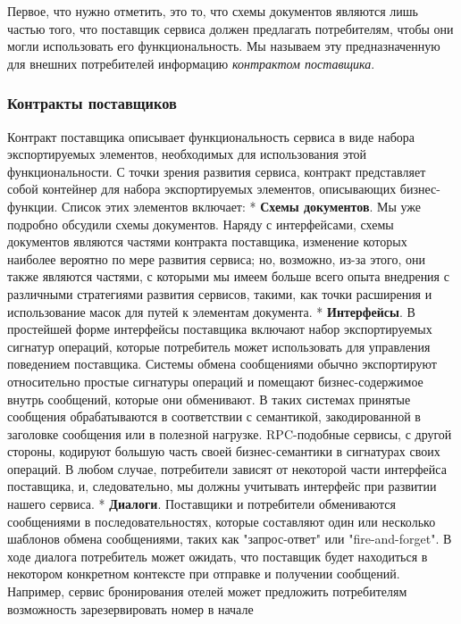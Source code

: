 \documentclass[11pt]{article}
\begin{document}
Первое, что нужно отметить, это то, что схемы документов являются лишь
частью того, что поставщик сервиса должен предлагать потребителям, чтобы
они могли использовать его функциональность. Мы называем эту
предназначенную для внешних потребителей информацию \emph{контрактом
поставщика}.

\subsubsection{Контракты
поставщиков}\label{ux43aux43eux43dux442ux440ux430ux43aux442ux44b-ux43fux43eux441ux442ux430ux432ux449ux438ux43aux43eux432}

Контракт поставщика описывает функциональность сервиса в виде набора
экспортируемых элементов, необходимых для использования этой
функциональности. С точки зрения развития сервиса, контракт представляет
собой контейнер для набора экспортируемых элементов, описывающих
бизнес-функции. Список этих элементов включает: * \textbf{Схемы
документов}. Мы уже подробно обсудили схемы документов. Наряду с
интерфейсами, схемы документов являются частями контракта поставщика,
изменение которых наиболее вероятно по мере развития сервиса; но,
возможно, из-за этого, они также являются частями, с которыми мы имеем
больше всего опыта внедрения с различными стратегиями развития сервисов,
такими, как точки расширения и использование масок для путей к элементам
документа. * \textbf{Интерфейсы}. В простейшей форме интерфейсы
поставщика включают набор экспортируемых сигнатур операций, которые
потребитель может использовать для управления поведением поставщика.
Системы обмена сообщениями обычно экспортируют относительно простые
сигнатуры операций и помещают бизнес-содержимое внутрь сообщений,
которые они обменивают. В таких системах принятые сообщения
обрабатываются в соответствии с семантикой, закодированной в заголовке
сообщения или в полезной нагрузке. RPC-подобные сервисы, с другой
стороны, кодируют большую часть своей бизнес-семантики в сигнатурах
своих операций. В любом случае, потребители зависят от некоторой части
интерфейса поставщика, и, следовательно, мы должны учитывать интерфейс
при развитии нашего сервиса. * \textbf{Диалоги}. Поставщики и
потребители обмениваются сообщениями в последовательностях, которые
составляют один или несколько шаблонов обмена сообщениями, таких как
"запрос-ответ" или "fire-and-forget". В ходе диалога потребитель может
ожидать, что поставщик будет находиться в некотором конкретном контексте
при отправке и получении сообщений. Например, сервис бронирования отелей
может предложить потребителям возможность зарезервировать номер в начале
\end{document}
